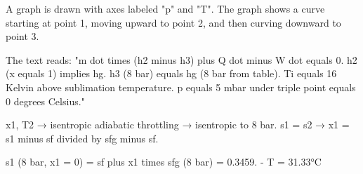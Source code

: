 A graph is drawn with axes labeled "p" and "T". The graph shows a curve starting at point 1, moving upward to point 2, and then curving downward to point 3.  

The text reads:  
"m dot times (h2 minus h3) plus Q dot minus W dot equals 0.  
h2 (x equals 1) implies hg.  
h3 (8 bar) equals hg (8 bar from table).  
Ti equals 16 Kelvin above sublimation temperature.  
p equals 5 mbar under triple point equals 0 degrees Celsius."

x1, T2 → isentropic adiabatic throttling → isentropic to 8 bar.  
s1 = s2 → x1 = s1 minus sf divided by sfg minus sf.  

s1 (8 bar, x1 = 0) = sf plus x1 times sfg (8 bar) = 0.3459.  
- T = 31.33°C